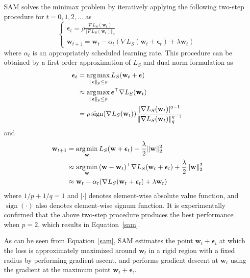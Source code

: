 \documentclass{article}
\DeclareMathOperator*{\argmax}{\arg\hspace{-0.07em}\max}
\DeclareMathOperator*{\argmin}{\arg\hspace{-0.07em}\min}
\newcommand{\mf}[1]{\mathbf{#1}}
\begin{document}
SAM solves the minimax problem by iteratively applying the following two-step procedure for $t=0,1,2,\ldots$ as
\begin{equation} \label{sam}
  \left\{
    \begin{array}{ll}
      \bm{\epsilon}_{t} = \rho \frac {\displaystyle \nabla L_S(\mf{w}_t)} {\displaystyle \Vert \nabla L_S(\mf{w}_t) \Vert_2} \\
      \mf{w}_{t+1} = \mf{w}_t - \alpha_t \left( \nabla L_S(\mf{w}_t + \bm{\epsilon}_{t}) + \lambda \mf{w}_t \right)
    \end{array}
  \right.
\end{equation}
where $\alpha_t$ is an appropriately scheduled learning rate. This procedure can be obtained by a first order approximation of $L_S$ and dual norm formulation as
\begin{align*}
    \bm{\epsilon}_{t} 
    & = \argmax_{\Vert \bm{\epsilon}\Vert _{p} \leq \rho } L_{S}(\mf{w}_t+\bm{\epsilon}) \\
    & \approx \argmax_{\Vert \bm{\epsilon}\Vert _{p} \leq \rho } \bm{\epsilon}^\top \nabla L_S(\mf{w}_t) \\
    & = \rho \operatorname{sign}(\nabla L_S(\mf{w}_t)) \frac {\displaystyle \vert \nabla L_S(\mf{w}_t) \vert^{q-1}} {\displaystyle \Vert \nabla L_S(\mf{w}_t) \Vert^{q-1}_q}
\end{align*}
and
\begin{align*}
    \mf{w}_{t+1} 
    & = \argmin_\mf{w} L_{S}(\mf{w}+\bm{\epsilon}_{t}) + \frac{\lambda}{2} \Vert\mf{w}\Vert^2_2 \\
    & \approx \argmin_\mf{w} \, (\mf{w}-\mf{w}_t)^\top \nabla L_S(\mf{w}_t + \bm{\epsilon}_{t}) + \frac{\lambda}{2} \Vert\mf{w}\Vert^2_2 \\
    & \approx \mf{w}_t - \alpha_t (\nabla L_S(\mf{w}_t + \bm{\epsilon}_{t}) + \lambda \mf{w}_t)
\end{align*}
where $1/p+1/q=1$ and $\vert \cdot \vert$ denotes element-wise absolute value function, and $\operatorname{sign}(\cdot)$ also denotes element-wise signum function.
It is experimentally confirmed that the above two-step procedure produces the best performance when $p=2$, which results in Equation~\ref{sam}.

\noindent As can be seen from Equation~\ref{sam}, SAM estimates the point $\mf{w}_t + \bm{\epsilon}_{t}$ at which the loss is approximately maximized around $\mf{w}_t$ in a rigid region with a fixed radius by performing gradient ascent, and performs gradient descent at $\mf{w}_t$ using the gradient at the maximum point $\mf{w}_t + \bm{\epsilon}_{t}$.
\end{document}
